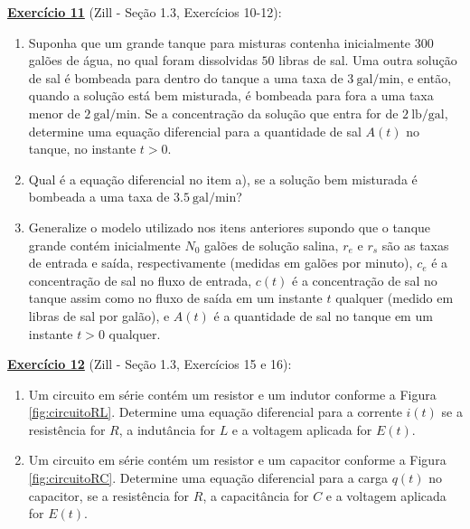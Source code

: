 \documentclass[oneside,12pt,a4paper]{report}
\begin{document}
    \noindent\textbf{\hyperlink{resp:ex11}{\hypertarget{quest:ex11}{Exercício 11}}} (Zill - Seção 1.3, Exercícios 10-12):
    \begin{enumerate}[label=\alph*)]
        \item Suponha que um grande tanque para misturas contenha inicialmente $300$ galões de água, no qual foram dissolvidas $50$ libras de sal. Uma outra solução de sal é bombeada para dentro do tanque a uma taxa de $3~\mathrm{gal/min}$, e então, quando a solução está bem misturada, é bombeada para fora a uma taxa menor de $2~\mathrm{gal/min}$. Se a concentração da solução que entra for de $2~\mathrm{lb/gal}$, determine uma equação diferencial para a quantidade de sal $A(t)$ no tanque, no instante $t > 0$.
        \item Qual é a equação diferencial no item a), se a solução bem misturada é bombeada a uma taxa de $3.5~\mathrm{gal/min}$?
        \item Generalize o modelo utilizado nos itens anteriores supondo que o tanque grande contém inicialmente $N_0$ galões de solução salina, $r_e$ e $r_s$ são as taxas de entrada e saída, respectivamente (medidas em galões por minuto), $c_e$ é a concentração de sal no fluxo de entrada, $c(t)$ é a concentração de sal no tanque assim como no fluxo de saída em um instante $t$ qualquer (medido em libras de sal por galão), e $A(t)$ é a quantidade de sal no tanque em um instante $t > 0$ qualquer.
    \end{enumerate}
    \vspace{0.5cm}

    \noindent\textbf{\hyperlink{resp:ex12}{\hypertarget{quest:ex12}{Exercício 12}}} (Zill - Seção 1.3, Exercícios 15 e 16):
    \begin{enumerate}[label=\alph*)]
        \item Um circuito em série contém um resistor e um indutor conforme a Figura \ref{fig:circuitoRL}. Determine uma equação diferencial para a corrente $i(t)$ se a resistência for $R$, a indutância for $L$ e a voltagem aplicada for $E(t)$.
        \item Um circuito em série contém um resistor e um capacitor conforme a Figura \ref{fig:circuitoRC}. Determine uma equação diferencial para a carga $q(t)$ no capacitor, se a resistência for $R$, a capacitância for $C$ e a voltagem aplicada for $E(t)$.
    \end{enumerate}
\end{document}
